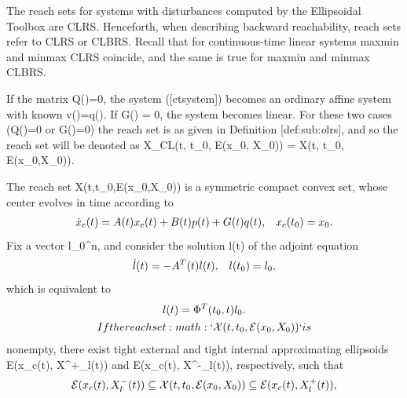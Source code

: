 \documentclass[letterpaper,10pt,english]{sphinxmanual}
\begin{document}
The reach sets for systems with disturbances computed by the Ellipsoidal
Toolbox are CLRS. Henceforth, when describing backward reachability,
reach sets refer to CLRS or CLBRS. Recall that for continuous-time
linear systems maxmin and minmax CLRS coincide, and the same is true for
maxmin and minmax CLBRS.

If the matrix Q(\cdot)=0, the system ({[}ctsystem{]}) becomes an
ordinary affine system with known v(\cdot)=q(\cdot). If
G(\cdot) = 0, the system becomes linear. For these two cases
(Q(\cdot)=0 or G(\cdot)=0) the reach set is as given in
Definition {[}def:sub:\emph{o}lrs{]}, and so the reach set will be denoted as
{\mathcal X}_{CL}(t, t_0, {\mathcal E}(x_0, X_0)) = {\mathcal X}(t, t_0, {\mathcal E}(x_0,X_0)).

The reach set {\mathcal X}(t,t_0,{\mathcal E}(x_0,X_0)) is a
symmetric compact convex set, whose center evolves in time according to
\begin{gather}
\begin{split}\dot{x}_c(t) = A(t)x_c(t) + B(t)p(t) + G(t)q(t), \;\;\;
x_c(t_0)=x_0. \label{fwdcenter}\end{split}\notag
\end{gather}
Fix a vector l_0^n, and consider the solution
l(t) of the adjoint equation
\begin{gather}
\begin{split}\dot{l}(t) = -A^T(t)l(t), \;\;\; l(t_0) = l_0,
\label{adjointct}\end{split}\notag
\end{gather}
which is equivalent to
\begin{gather}
\begin{split}l(t) = \Phi^T(t_0, t)l_0.\end{split}\notag\\\begin{split}If the reach set :math:`{\mathcal X}(t, t_0, {\mathcal E}(x_0,X_0))` is\end{split}\notag
\end{gather}
nonempty, there exist tight external and tight internal approximating
ellipsoids {\mathcal E}(x_c(t), X^+_l(t)) and
{\mathcal E}(x_c(t), X^-_l(t)), respectively, such that
\begin{gather}
\begin{split}{\mathcal E}(x_c(t), X^-_l(t))\subseteq{\mathcal X}(t,t_0,{\mathcal E}(x_0,X_0))
\subseteq {\mathcal E}(x_c(t), X^+_l(t)),
\label{fwdinclusion}\end{split}\notag
\end{gather}
\end{document}
